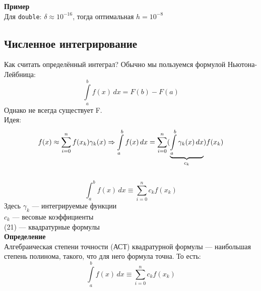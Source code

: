 \textbf{Пример}\\
Для \texttt{double}: $\delta \approx 10^{-16}$, тогда оптимальная $h = 10^{-8}$

\subsection{Численное интегрирование}
Как считать определённый интеграл? Обычно мы пользуемся формулой Ньютона-Лейбница:
\begin{equation}
\int\limits_{a}^{b} f(x) \, dx = F(b) - F(a)
\end{equation}
Однако не всегда существует F.\\
Идея:\\
\[
f(x) \approx \sum\limits_{i=0}^{n}f(x_k)\gamma_k(x) \Rightarrow \int\limits_{a}^{b} f(x) \, dx  =  \sum\limits_{i=0}^{n} ( \underbrace{\int\limits_{a}^{b} \gamma_k(x) \, dx}_{c_k} ) f(x_k)\\
\]\\

\begin{equation}
\int_{a}^{b} f(x) \, dx  \equiv  \sum\limits_{i=0}^{n} {c_k}  f(x_k)
\end{equation}
Здесь $\gamma_k$ --- интегрируемые функции\\
$c_k$ --- весовые коэффициенты\\
(21) --- квадратурные формулы\\

\textbf{Определение}\\
Алгебраическая степени точности (АСТ) квадратурной формулы --- наибольшая степень полинома, такого, что для него формула точна. То есть:\\
\[\int\limits_{a}^{b} f(x) \, dx  \equiv  \sum\limits_{i=0}^{n} {c_k}  f(x_k)\]



